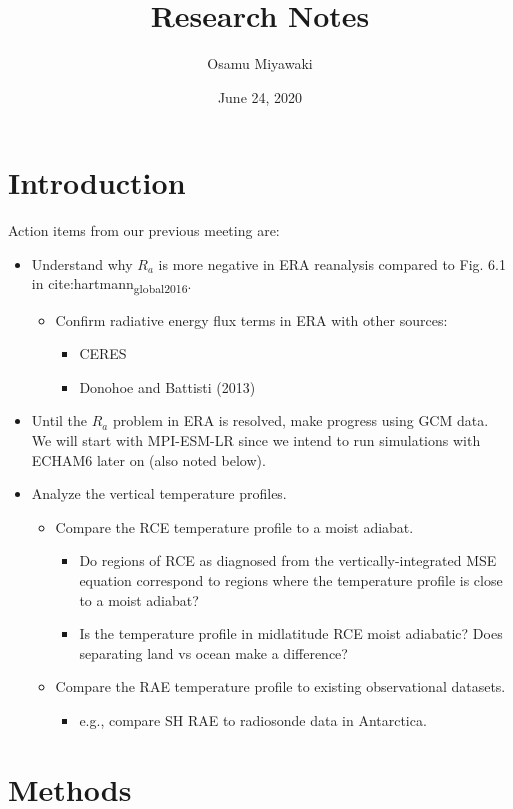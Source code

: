 \documentclass[11pt]{article}
\author{Osamu Miyawaki}
\date{June 24, 2020}
\title{Research Notes}
\begin{document}
\maketitle

\section{Introduction}
\label{sec:orga40ad3e}
Action items from our previous meeting are:
\begin{itemize}
\item Understand why \(R_a\) is more negative in ERA reanalysis compared to Fig. 6.1 in cite:hartmann\textsubscript{global}\textsubscript{2016}.
\begin{itemize}
\item Confirm radiative energy flux terms in ERA with other sources:
\begin{itemize}
\item CERES
\item Donohoe and Battisti (2013)
\end{itemize}
\end{itemize}
\item Until the \(R_a\) problem in ERA is resolved, make progress using GCM data. We will start with MPI-ESM-LR since we intend to run simulations with ECHAM6 later on (also noted below).
\item Analyze the vertical temperature profiles.
\begin{itemize}
\item Compare the RCE temperature profile to a moist adiabat.
\begin{itemize}
\item Do regions of RCE as diagnosed from the vertically-integrated MSE equation correspond to regions where the temperature profile is close to a moist adiabat?
\item Is the temperature profile in midlatitude RCE moist adiabatic? Does separating land vs ocean make a difference?
\end{itemize}
\item Compare the RAE temperature profile to existing observational datasets.
\begin{itemize}
\item e.g., compare SH RAE to radiosonde data in Antarctica.
\end{itemize}
\end{itemize}
\end{itemize}

\section{Methods}
\label{sec:org84e4e3f}
\end{document}
